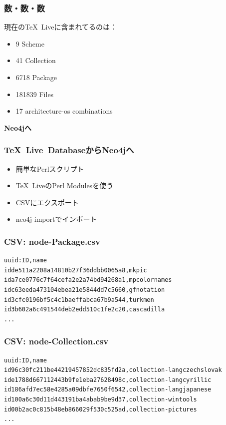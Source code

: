 \documentclass[hyperref]{beamer}
\newcommand{\tl}{\TeX~Live}
\newcommand{\bis}{\\[\bigskipamount]}
\newcommand{\cutin}[1]{%
  \begin{frame}[c]
    \begin{center}
      {\Large\bf\usebeamercolor[fg]{structure}#1}
    \end{center}
  \end{frame}
}
\begin{document}
\begin{frame}
  \frametitle{数・数・数}
  現在の\tl に含まれてるのは：
  \begin{itemize}
  \item 9 Scheme\bis
  \item 41 Collection\bis
  \item 6718 Package\bis
  \item 181839 Files\bis
  \item 17 architecture-os combinations
  \end{itemize}
\end{frame}

\cutin{Neo4jへ}

\begin{frame}
  \frametitle{\tl\ DatabaseからNeo4jへ}
  \begin{itemize}
  \item 簡単なPerlスクリプト\bis
  \item \tl のPerl Modulesを使う\bis
  \item CSVにエクスポート\bis
  \item neo4j-importでインポート
  \end{itemize}
\end{frame}

\begin{frame}[fragile]
  \frametitle{CSV: node-Package.csv}
  \begin{lstlisting}
uuid:ID,name
idde511a2208a14810b27f36ddbb0065a8,mkpic
ida7ce0776c7f64cefa2e2a74bd94268a1,mpcolornames
idc63eeda473104ebea21e5844dd7c5660,gfnotation
id3cfc0196bf5c4c1baeffabca67b9a544,turkmen
id3b602a6c491544deb2edd510c1fe2c20,cascadilla
...
\end{lstlisting}

\end{frame}


\begin{frame}[fragile]
  \frametitle{CSV: node-Collection.csv}
  \begin{lstlisting}
uuid:ID,name
id96c30fc211be44219457852dc835fd2a,collection-langczechslovak
ide1788d667112443b9fe1eba27628498c,collection-langcyrillic
id186afd7ec58e4285a09dbfe7650f6542,collection-langjapanese
id100a6c30d11d443191ba4abab9be9d37,collection-wintools
id00b2ac0c815b48eb866029f530c525ad,collection-pictures
...
\end{lstlisting}

\end{frame}
\end{document}
